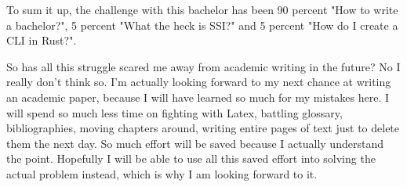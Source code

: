 To sum it up, the challenge with this bachelor has been 90 percent "How to write a bachelor?", 5 percent "What the heck is SSI?" and 5 percent "How do I create a CLI in Rust?".

So has all this struggle scared me away from academic writing in the future? No I really don't think so. I'm actually looking forward to my next chance at writing an academic paper, because I will have learned so much for my mistakes here. I will spend so much less time on fighting with Latex, battling glossary, bibliographies, moving chapters around, writing entire pages of text just to delete them the next day. So much effort will be saved because I actually understand the point. Hopefully I will be able to use all this saved effort into solving the actual problem instead, which is why I am looking forward to it.
